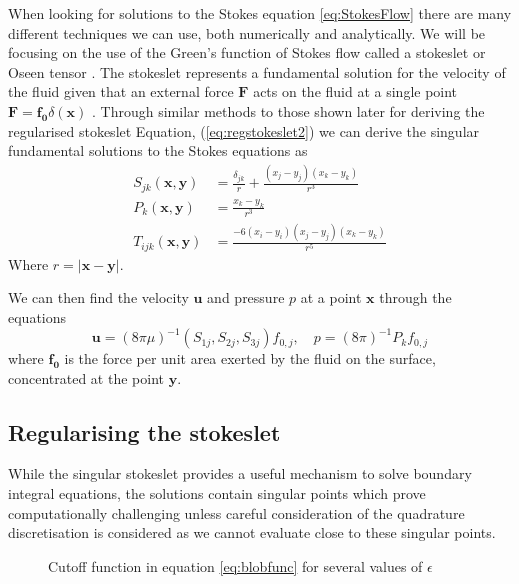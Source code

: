 When looking for solutions to the Stokes equation \cref{eq:StokesFlow} there are many different techniques we can use, both numerically and analytically. We will be focusing on the use of the Green's function of Stokes flow called a stokeslet \cite{Pozrikidis1992BoundaryFlow,Hancock1953TheLiquids} or Oseen tensor \cite{Oseen1927NeuereHydrodynamik}. The stokeslet represents a fundamental solution for the velocity of the fluid given that an external force $\bm{F}$ acts on the fluid at a single point $\bm{F} = \bm{f_0}\delta(\bm{x})$ \cite{Hancock1953TheLiquids, Batchelor2000AnDynamics}.
Through similar methods to those shown later for deriving the regularised stokeslet Equation, (\cref{eq:regstokeslet2}) we can derive the singular fundamental solutions to the Stokes equations as
\begin{equation}
\label{eq:singularsolutions}
\begin{aligned}
    S_{j k}(\bm{x}, \bm{y}) &= \frac{\delta_{j k}}{r}+\frac{\left(x_{j}-y_{j}\right)\left(x_{k}-y_{k}\right)}{r^{3}} \\
    P_{k}(\bm{x}, \bm{y}) &= \frac{x_{k}-y_{k}}{r^{3}} \\
    T_{ijk}(\bm{x}, \bm{y}) &= \frac{-6\left(x_{i}-y_{i}\right)\left(x_{j}-y_{j}\right)\left(x_{k}-y_{k}\right)}{r^5}
\end{aligned}
\end{equation}
Where $r=|\bm{x}-\bm{y}|$.

We can then find the velocity $\bm{u}$ and pressure $p$ at a point $\bm{x}$ through the equations
\begin{equation*}
    \bm{u} = (8 \pi \mu)^{-1} \left(S_{1j},S_{2j},S_{3j}\right)f_{0,j}, \quad p = (8 \pi)^{-1} P_k f_{0,j} 
\end{equation*}
where $\bm{f_{0}}$ is the force per unit area exerted by the fluid on the surface, concentrated at the point $\bm{y}$. 


\subsection{Regularising the stokeslet}
While the singular stokeslet provides a useful mechanism to solve boundary integral equations, the solutions contain singular points which prove computationally challenging unless careful consideration of the quadrature discretisation is considered as we cannot evaluate close to these singular points.

\begin{figure}[ht]
    \centering
    \resizebox{.6\linewidth}{!}{}
    \caption{Cutoff function in equation \cref{eq:blobfunc} for several values of $\epsilon$}
    \label{fig:blobfunc}
\end{figure}

